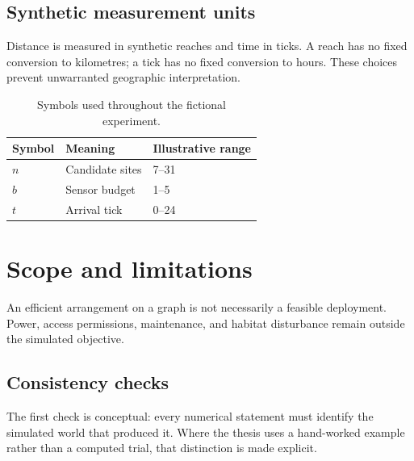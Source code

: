 \subsection{Synthetic measurement units}\label{demo-framing-units}
Distance is measured in synthetic reaches and time in ticks. A reach has no fixed conversion to kilometres; a tick has no fixed conversion to hours. These choices prevent unwarranted geographic interpretation.
\begin{table}[htbp]
\centering
\begin{tabular}{lll}
\hline
Symbol & Meaning & Illustrative range \\
\hline
$n$ & Candidate sites & 7--31 \\
$b$ & Sensor budget & 1--5 \\
$t$ & Arrival tick & 0--24 \\
\hline
\end{tabular}
\caption{Symbols used throughout the fictional experiment.}\label{demo-tab-symbols}
\end{table}
\section{Scope and limitations}\label{demo-framing-boundaries}
An efficient arrangement on a graph is not necessarily a feasible deployment. Power, access permissions, maintenance, and habitat disturbance remain outside the simulated objective.
\subsection{Consistency checks}\label{demo-framing-checks}
The first check is conceptual: every numerical statement must identify the simulated world that produced it. Where the thesis uses a hand-worked example rather than a computed trial, that distinction is made explicit.
